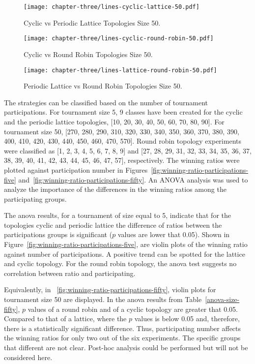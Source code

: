 \begin{figure}[H]
\centering
    \texttt{[image: chapter-three/lines-cyclic-lattice-50.pdf]}
\caption{Cyclic vs Periodic Lattice Topologies Size 50.}
\label{fig:winning-rankings-fifty-c-l}
\end{figure}

\begin{figure}[H]
\centering
    \texttt{[image: chapter-three/lines-cyclic-round-robin-50.pdf]}
\caption{Cyclic vs Round Robin Topologies Size 50.}
\label{fig:winning-rankings-fifty-c-r}
\end{figure}

\begin{figure}[H]
\centering
    \texttt{[image: chapter-three/lines-lattice-round-robin-50.pdf]}
\caption{Periodic Lattice vs Round
             Robin Topologies Size 50.}
             \label{fig:winning-rankings-fifty-l-r}
\end{figure}

The strategies can be classified based on the number of tournament
participations. For tournament size 5, 9 classes have been created for
the cyclic and the periodic lattice topologies, [10, 20, 30, 40, 50, 60, 70, 80, 90].
For tournament
size 50, [270, 280, 290, 310, 320, 330, 340, 350, 360, 370, 380, 390, 400, 410,
420, 430, 440, 450, 460, 470, 570]. Round robin topology
experiments were classified as [1, 2, 3, 4, 5, 6, 7, 8, 9] and
[27, 28, 29, 31, 32, 33, 34, 35, 36, 37, 38, 39, 40, 41, 42, 43, 44, 45, 46, 47, 57],
respectively. The winning ratios were plotted against participation number
in Figures~\ref{fig:winning-ratio-participations-five} and~\ref{fig:winning-ratio-participations-fifty}.
An ANOVA analysis was used to analyze the importance of the
differences in the winning ratios among the participating groups.

The anova results, for a tournament of size equal to 5,
indicate that for the topologies cyclic and periodic lattice the difference
of ratios between the participations groups is significant (\(p\) values
are lower that 0.05). Shown in Figure~\ref{fig:winning-ratio-participations-five},
are violin plots of the winning ratio against number of participations. A positive
trend can be spotted for the lattice and cyclic topology. For the round robin
topology, the anova test suggests no correlation between ratio and participating.

Equivalently, in ~\ref{fig:winning-ratio-participations-fifty}, violin plots for
tournament size 50 are displayed.  In the anova results from Table~\ref{anova-size-fifty},
\(p\) values of a round robin and of a cyclic topology are greater that 0.05.
Compared to that of a lattice, where the \(p\) values is below 0.05 and, therefore,
there is a statistically significant difference.
Thus, participating number affects the winning ratios for only two out of the six
experiments. The specific groups that different are not clear.
Post-hoc analysis could be performed but will not be considered here.

